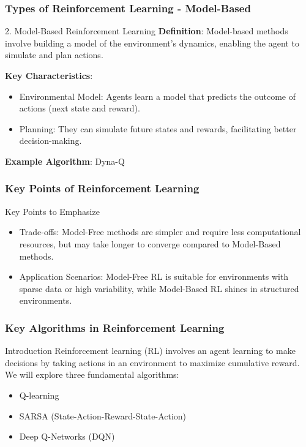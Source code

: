 \documentclass[aspectratio=169]{beamer}
\begin{document}
\begin{frame}[fragile]
    \frametitle{Types of Reinforcement Learning - Model-Based}
    \begin{block}{2. Model-Based Reinforcement Learning}
        \textbf{Definition}: Model-based methods involve building a model of the environment's dynamics, enabling the agent to simulate and plan actions.

        \textbf{Key Characteristics}:
        \begin{itemize}
            \item Environmental Model: Agents learn a model that predicts the outcome of actions (next state and reward).
            \item Planning: They can simulate future states and rewards, facilitating better decision-making.
        \end{itemize}

        \textbf{Example Algorithm}: Dyna-Q
    \end{block}
\end{frame}

\begin{frame}[fragile]
    \frametitle{Key Points of Reinforcement Learning}
    \begin{block}{Key Points to Emphasize}
        \begin{itemize}
            \item Trade-offs: Model-Free methods are simpler and require less computational resources, but may take longer to converge compared to Model-Based methods.
            \item Application Scenarios: Model-Free RL is suitable for environments with sparse data or high variability, while Model-Based RL shines in structured environments.
        \end{itemize}
    \end{block}
\end{frame}

\begin{frame}[fragile]
    \frametitle{Key Algorithms in Reinforcement Learning}
    
    \begin{block}{Introduction}
        Reinforcement learning (RL) involves an agent learning to make decisions by taking actions in an environment to maximize cumulative reward. We will explore three fundamental algorithms:
        \begin{itemize}
            \item Q-learning
            \item SARSA (State-Action-Reward-State-Action)
            \item Deep Q-Networks (DQN)
        \end{itemize}
    \end{block}
\end{frame}
\end{document}
